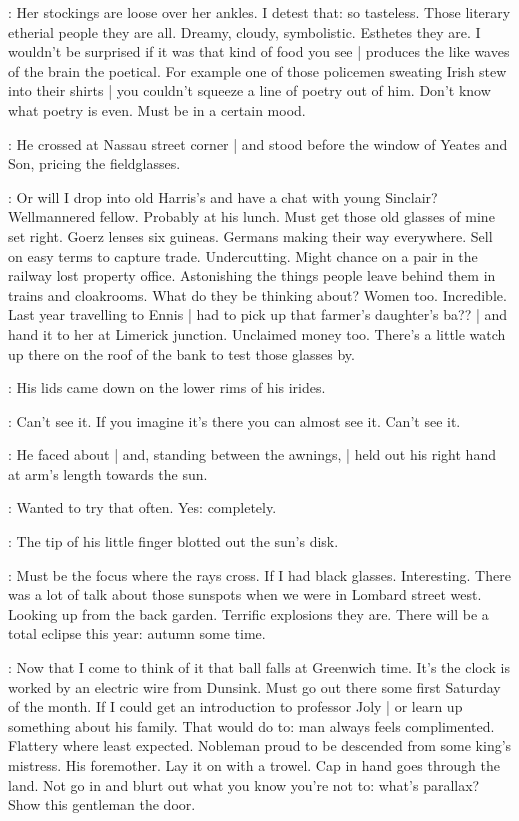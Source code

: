 \BloomInt:
Her stockings are loose over her ankles.
I detest that:
so tasteless.
Those literary etherial people they are all.
Dreamy,
cloudy,
symbolistic.
Esthetes they are.
I wouldn't be surprised if it was that kind of food you see |
produces the like waves of the brain the poetical.
For example
one of those policemen sweating Irish stew into their shirts |
you couldn't squeeze a line of poetry out of him.
Don't know what poetry is even.
Must be in a certain mood.

%

:
He crossed at Nassau street corner |
and stood before the window of Yeates and Son,
pricing the fieldglasses.

\BloomInt:
Or will I drop into old Harris's
and have a chat with young Sinclair?
Wellmannered fellow.
Probably at his lunch.
Must get those old glasses of mine set right.
Goerz lenses six guineas.
Germans making their way everywhere.
Sell on easy terms to capture trade.
Undercutting.
Might chance on a pair in the railway lost property office.
Astonishing the things people leave behind them in trains and cloakrooms.
What do they be thinking about?
Women too.
Incredible.
Last year travelling to Ennis |
had to pick up that farmer's daughter's ba?? |
and hand it to her at Limerick junction.
Unclaimed money too.
There's a little watch up there on the roof of the bank 
to test those glasses by.

:
His lids came down on the lower rims of his irides.

\BloomInt:
Can't see it.
If you imagine it's there you can almost see it.
Can't see it.

:
He faced about |
and, standing between the awnings, |
held out his right hand at arm's length towards the sun.

\BloomInt:
Wanted to try that often.
Yes:
completely.

:
The tip of his little finger blotted out the sun's disk.

\BloomInt:
Must be the focus where the rays cross.
If I had black glasses.
Interesting.
There was a lot of talk about those sunspots when we were in Lombard street west.
Looking up from the back garden.
Terrific explosions they are.
There will be a total eclipse this year:
autumn some time.

\BloomInt:
Now that I come to think of it 
that ball falls at Greenwich time.
It's the clock is worked by an electric wire from Dunsink.
Must go out there
some first Saturday of the month.
If I could get an introduction to professor Joly |
or learn up something about his family.
That would do to:
man always feels complimented.
Flattery where least expected.
Nobleman proud to be descended from some king's mistress.
His foremother.
Lay it on with a trowel.
Cap in hand goes through the land.
Not go in and blurt out what you know you're not to:
what's parallax?
Show this gentleman the door.

